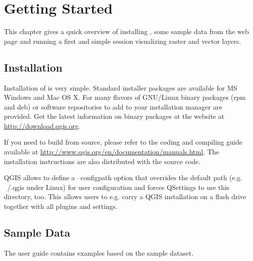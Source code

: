 
\chapter{Getting Started}\label{label_getstarted}


This chapter gives a quick overview of installing \qg, some sample 
data from the \qg web page and running a first and simple session 
visualizing raster and vector layers.

\section{Installation}\label{label_installation}

Installation of \qg is very simple. Standard installer packages are
available for MS Windows and Mac OS X. For many flavors of GNU/Linux binary
packages (rpm and deb) or software repositories to add to your installation
manager are provided. Get the latest information on binary packages at the
\qg website at \url{http://download.qgis.org}.


If you need to build \qg from source, please refer to the coding and
compiling guide available at \url{http://www.qgis.org/en/documentation/manuals.html}. 
The installation instructions are also distributed with the \qg source
code.


QGIS allows to define a --configpath option that overrides the default path 
(e.g. ~/.qgis under Linux) for user configuration and forces QSettings to use 
this directory, too. This allows users to e.g. carry a QGIS installation on a 
flash drive together with all plugins and settings. 

\section{Sample Data}\label{label_sampledata}

The user guide contains examples based on the \qg sample dataset. 

